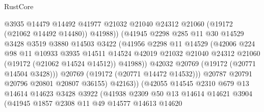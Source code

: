 \begin{lexlean}{RustCore}
\begin{coremodule}
                              @3935
                              @14479
                              @14492
                              @41977
                              @21032
                              @21040
                              @24312
                              @21060
                              (@19172 (@21062 @14492 @14480))
                              @41988))
                          (@41945
                            @2298
                            @285
                            @11
                            @30
                            @14529
                            @3428
                            @3519
                            @3880
                            @14503
                            @3422
                            (@41956
                              @2298
                              @11
                              @14529
                              (@42006
                                @224
                                @98
                                @11
                                @10933
                                @3935
                                @14511
                                @14524
                                @42019
                                @21032
                                @21040
                                @24312
                                @21060
                                (@19172 (@21062 @14524 @14512))
                                @41988))
                            @42032
                            @20769
                            (@19172 (@20771 @14504 @3428)))
                          @20769
                          (@19172 (@20771 @14472 @14532)))
                        @20787
                        @20791
                        @20796
                        @20801
                        @20807
                        @36155)
                      @42163))
                  (@42055
                    @14545
                    @2310
                    @679
                    @13
                    @14614
                    @14623
                    @3428
                    @3922
                    (@41938
                      @2309
                      @50
                      @13
                      @14614
                      @14621
                      @3904
                      (@41945
                        @1857
                        @2308
                        @11
                        @49
                        @14577
                        @14613
                        @14620

\end{coremodule}
\end{lexlean}

